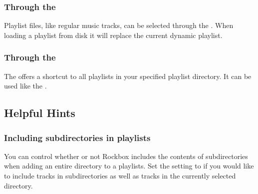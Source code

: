 \subsubsection{Through the }
Playlist files, like regular music tracks, can be selected through the 
. When loading a playlist from disk it will replace
the current dynamic playlist.

\subsubsection{Through the }
The  offers a shortcut to all playlists in your
\daps{} specified playlist directory.
It can be used like the .

\subsection{Helpful Hints}

\subsubsection{Including subdirectories in playlists}
You can control whether or not Rockbox includes the contents of
subdirectories when adding an entire directory to a playlists.
Set the 
setting to  if you would like to include tracks in subdirectories
as well as tracks in the currently selected directory.
